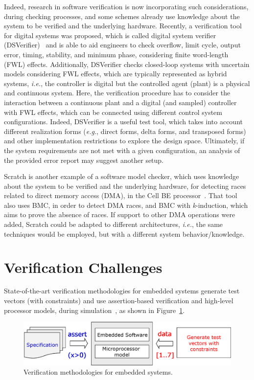 \documentclass{acm_sen_article}
\begin{document}
Indeed, research in software verification is now incorporating such considerations, during checking processes, and some schemes already use knowledge about the system to be verified and the underlying hardware. Recently, a verification tool for digital systems was proposed, which is called digital system verifier (DSVerifier)~\cite{dsv_spin2015} and is able to aid engineers to check overflow, limit cycle, output error, timing, stability, and minimum phase, considering finite word-length (FWL) effects. Additionally, DSVerifier checks closed-loop systems with uncertain models considering FWL effects, which are typically represented as hybrid systems, {\it i.e.}, the controller is digital but the controlled agent (plant) is a physical and continuous system. Here, the verification procedure has to consider the interaction between a continuous plant and a digital (and sampled) controller with FWL effects, which can be connected using different control system configurations. Indeed, DSVerifier is a useful test tool, which takes into account different realization forms ({\it e.g.}, direct forms, delta forms, and transposed forms) and other implementation restrictions to explore the design space. Ultimately, if the system requirements are not met with a given configuration, an analysis of the provided error report may suggest another setup. 

Scratch is another example of a software model checker, which uses knowledge about the system to be verified and the underlying hardware, for detecting races related to direct memory access (DMA), in the Cell BE processor~\cite{Donaldson10}. That tool also uses BMC, in order to detect DMA races, and BMC with \textit{k}-induction, which aims to prove the absence of races. If support to other DMA operations were added, Scratch could be adapted to different architectures, {\it i.e.}, the same techniques would be employed, but with a different system behavior/knowledge.

\section{Verification Challenges}
\label{Verification-Challenges} 

State-of-the-art verification methodologies for embedded systems generate test vectors (with constraints) and use assertion-based verification and high-level processor models, during simulation~\cite{Behrend15,Lettnin09}, as shown in Figure~\ref{verification-methodologies}. 
%
\begin{figure}[h]
	\centering
	\includegraphics[scale=0.35]{figure3.eps}
	\caption{Verification methodologies for embedded systems.}
	\label{verification-methodologies}
\end{figure}
\end{document}
